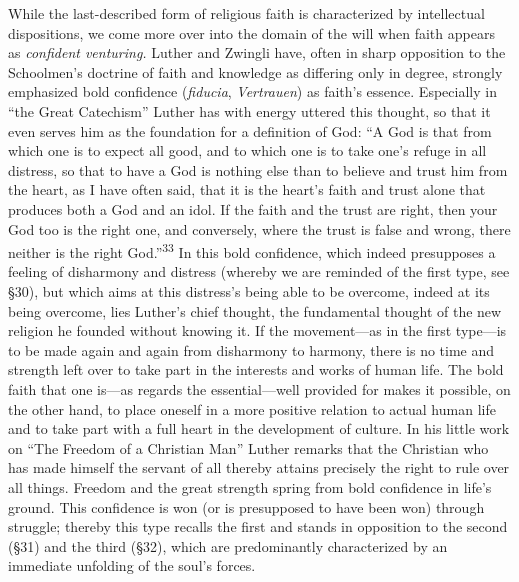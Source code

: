 \documentclass[12pt,a4paper]{book}
\newcommand{\opage}[1]{\marginnote{\footnotesize\textit{[#1]}}}
\begin{document}

While the last-described form of religious faith is characterized by intellectual
dispositions, we come more over into the domain of the will when faith appears as
\emph{confident venturing.} Luther and Zwingli have, often in sharp opposition to
the Schoolmen's doctrine of faith and knowledge as differing only in degree,
strongly emphasized bold confidence (\textit{fiducia}, \textit{Vertrauen}) as
faith's essence. Especially in ``the Great Catechism'' Luther has with energy
uttered this thought, so that it even serves him as the foundation for a
definition of God: ``A God is that from which one is 
\opage{78}to expect all good, and to
which one is to take one's refuge in all distress, so that to have a God is
nothing else than to believe and trust him from the heart, as I have often said,
that it is the heart's faith and trust alone that produces both a God and an idol.
If the faith and the trust are right, then your God too is the right one, and
conversely, where the trust is false and wrong, there neither is the right
God.''\textsuperscript{33} In this bold confidence, which indeed presupposes a
feeling of disharmony and distress (whereby we are reminded of the first type, see
§30), but which aims at this distress's being able to be overcome, indeed at its
being overcome, lies Luther's chief thought, the fundamental thought of the new
religion he founded without knowing it. If the movement---as in the first
type---is to be made again and again from disharmony to harmony, there is no time
and strength left over to take part in the interests and works of human life. The
bold faith that one is---as regards the essential---well provided for makes it
possible, on the other hand, to place oneself in a more positive relation to
actual human life and to take part with a full heart in the development of
culture. In his little work on ``The Freedom of a Christian Man'' Luther remarks
that the Christian who has made himself the servant of all thereby attains
precisely the right to rule over all things. Freedom and the great strength spring
from bold confidence in life's ground. This confidence is won (or is presupposed
to have been won) through struggle; thereby this type recalls the first and stands
in opposition to the second (§31) and the third (§32), which are predominantly
characterized by an immediate unfolding of the soul's forces.
\end{document}
